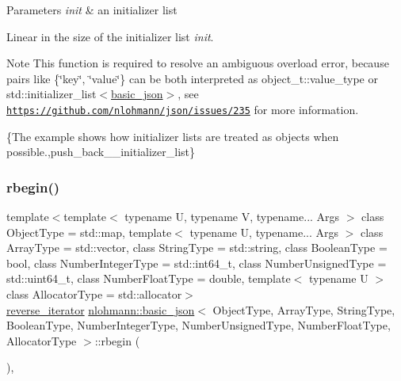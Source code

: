 \begin{DoxyParams}{Parameters}
{\em init} & an initializer list\\
\hline
\end{DoxyParams}
Linear in the size of the initializer list {\itshape init}.

\begin{DoxyNote}{Note}
This function is required to resolve an ambiguous overload error, because pairs like {\ttfamily \{\char`\"{}key\char`\"{}, \char`\"{}value\char`\"{}\}} can be both interpreted as {\ttfamily object\+\_\+t\+::value\+\_\+type} or {\ttfamily std\+::initializer\+\_\+list$<$\hyperlink{classnlohmann_1_1basic__json}{basic\+\_\+json}$>$}, see \href{https://github.com/nlohmann/json/issues/235}{\tt https\+://github.\+com/nlohmann/json/issues/235} for more information.
\end{DoxyNote}
\{The example shows how initializer lists are treated as objects when possible.,push\+\_\+back\+\_\+\+\_\+initializer\+\_\+list\} \hypertarget{classnlohmann_1_1basic__json_a62ccf5b9b3674aec2403fbc02da03db8}{}\label{classnlohmann_1_1basic__json_a62ccf5b9b3674aec2403fbc02da03db8} 
\subsubsection{\texorpdfstring{rbegin()}{rbegin()}\hspace{0.1cm}{\footnotesize\ttfamily [1/2]}}
{\footnotesize\ttfamily template$<$template$<$ typename U, typename V, typename... Args $>$ class Object\+Type = std\+::map, template$<$ typename U, typename... Args $>$ class Array\+Type = std\+::vector, class String\+Type  = std\+::string, class Boolean\+Type  = bool, class Number\+Integer\+Type  = std\+::int64\+\_\+t, class Number\+Unsigned\+Type  = std\+::uint64\+\_\+t, class Number\+Float\+Type  = double, template$<$ typename U $>$ class Allocator\+Type = std\+::allocator$>$ \\
\hyperlink{classnlohmann_1_1basic__json_a2f1f83aa187a56dc5ec7a7027065ac8a}{reverse\+\_\+iterator} \hyperlink{classnlohmann_1_1basic__json}{nlohmann\+::basic\+\_\+json}$<$ Object\+Type, Array\+Type, String\+Type, Boolean\+Type, Number\+Integer\+Type, Number\+Unsigned\+Type, Number\+Float\+Type, Allocator\+Type $>$\+::rbegin (\begin{DoxyParamCaption}{ }\end{DoxyParamCaption})\hspace{0.3cm}{\ttfamily [inline]}, {\ttfamily [noexcept]}}



